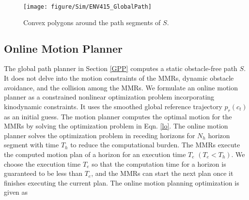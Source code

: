 \begin{figure}[H]
 	\centerline{\texttt{[image: figure/Sim/ENV415\_GlobalPath]}}
 	\caption{Convex polygons around the path segments of $S$.}
 	\label{fig:6}
\end{figure}
 
\subsection{Online Motion Planner} \label{OMP}
The global path planner in Section \ref{GPP} computes a static obstacle-free path $S$. It does not delve into the motion constraints of the MMRs, dynamic obstacle avoidance, and the collision among the MMRs. We formulate an online motion planner as a constrained nonlinear optimization problem incorporating kinodynamic constraints. It uses the smoothed global reference trajectory $p_r(c_t)$ as an initial guess. The motion planner computes the optimal motion for the MMRs by solving the optimization problem in Eqn. \ref{lo}. The online motion planner solves the optimization problem in receding horizons for $N_h$ horizon segment with time $T_h$ to reduce the computational burden. The MMRs execute the computed motion plan of a horizon for an execution time $T_e$ $(T_e < T_h)$. We choose the execution time $T_e$ so that the computation time for a horizon is guaranteed to be less than $T_e$, and the MMRs can start the next plan once it finishes executing the current plan. The online motion planning optimization is given as

